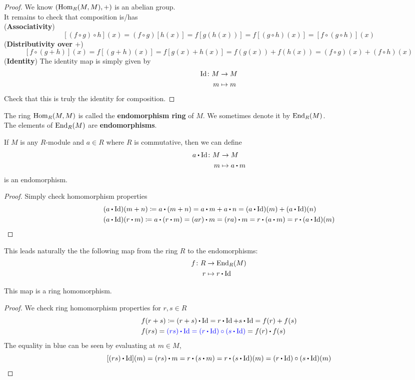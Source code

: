 \documentclass[../Main.tex]{subfiles}
\begin{document}
\begin{proof}
	We know $(\operatorname{Hom}_R(M,M),+)$ is an abelian group.\\
	It remains to check that composition is/has \\
	(\textbf{Associativity})
		\[[(f\circ g) \circ h](x) = (f\circ g)[h(x)] = f[g(h(x))] = f[(g\circ h)(x)] = [f\circ (g\circ h)](x)\]
	(\textbf{Distributivity over $+$})
		\[[f\circ (g+h)](x) = f[(g+h)(x)] = f[g(x)+h(x)] = f(g(x)) +f(h(x)) = (f\circ g)(x) + (f\circ h)(x)\]
	(\textbf{Identity})
		The identity map is simply given by
		\begin{align*}
		\operatorname{Id} \colon M&\to M \\
		m&\mapsto m
		\end{align*}
		\Exr Check that this is truly the identity for composition.
\end{proof}
\begin{dfn}[title = Endomorphisms and Endomorphism Ring]
	The ring $\operatorname{Hom}_R(M,M)$ is called the \textbf{endomorphism ring} of $M$. We sometimes denote it by $\operatorname{End}_R(M)$.\\
	The elements of $\operatorname{End}_R(M)$ are \textbf{endomorphisms}.
\end{dfn}
\begin{example}
	If $M$ is any $R$-module and $a\in R$ where $R$ is commutative, then we can define
	\begin{align*}
	a\rdot \Id \colon M &\to M \\
	m&\mapsto a\rdot m
	\end{align*}
	is an endomorphism.
	\begin{proof}
		Simply check homomorphism properties
	\begin{align*}
	&(a\rdot \Id)(m+n)\coloneqq a\rdot (m+n) = a\rdot m + a\rdot n = (a\rdot \Id)(m) + (a\rdot \Id)(n)\\
	&(a\rdot \Id)(r\rdot m) \coloneqq a\rdot (r\rdot m) = (ar )\rdot m = (r a)\rdot m = r\rdot (a\rdot m) = r\rdot (a\rdot \Id)(m) \qedhere
	\end{align*}
	\end{proof}
\end{example}
This leads naturally the the following map from the ring $R$ to the endomorphisms:
\begin{align*}
f\colon R&\to \End_R(M)\\
r&\mapsto r\rdot \Id
\end{align*}
\begin{claim}
	This map is a ring homomorphism.
\end{claim}
\begin{proof}
	We check ring homomorphism properties for $r,s\in R$
	\begin{align*}
	&f(r+s)\coloneqq (r+s)\rdot \Id = r\rdot \Id + s\rdot \Id = f(r)+f(s)\\
	&f(r s) = {\color{blue}{(r s)\rdot \Id = (r\rdot \Id) \circ (s\rdot \Id)}} = f(r)\rdot f(s)\qedhere
	\end{align*}
	The equality in blue can be seen by evaluating at $m\in M$,
	\[[(r s)\rdot \Id](m)=(r s)\rdot m = r\rdot (s\rdot m)= r\rdot (s\rdot \Id)(m) = (r\rdot \Id)\circ (s\rdot \Id)(m) \qedhere \]
\end{proof}
\end{document}
